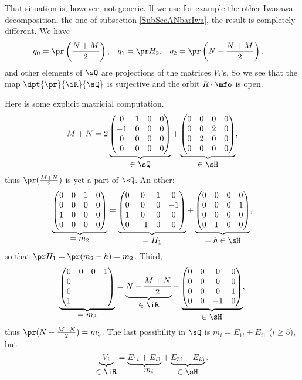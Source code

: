 That situation is, however, not generic. If we use for example the other Iwasawa decomposition, the one of subsection \ref{SubSecANbarIwa}, the result is completely different. We have
\begin{align}
  q_{0}&=\pr\left( \frac{ N+M }{ 2 } \right),
&q_{1}&=\pr H_{2},
&q_{2}&=\pr\left( N-\frac{ N+M }{ 2 } \right),
\end{align}
and other elements of $\sQ$ are projections of the matrices $V_{i}$'s.  So we see that the map $\dpt{\pr}{\iR}{\sQ}$ is surjective and \label{pg:mfo_ouvert} the orbit $R\cdot\mfo$ is open.

Here is some explicit matricial computation.
\[
   M+N=2
 \underbrace{
\begin{pmatrix}
  0 &1&0&0\\
  -1&0&0&0\\
  0 &0&0&0\\
  0 &0&0&0
\end{pmatrix}}_{\displaystyle\in\sQ}
+
\underbrace{
\begin{pmatrix}
  0&0&0&0\\
  0&0&2&0\\
  0&2&0&0\\
  0&0&0&0
\end{pmatrix}}_{\displaystyle\in\sH},
\]
thus $\pr(\frac{M+N}{2})$ is yet a part of $\sQ$. An other:
\[
 \underbrace{
\begin{pmatrix}
  0 &0&1&0\\
  0&0&0&0\\
  1 &0&0&0\\
  0 &0&0&0
\end{pmatrix}}_{\displaystyle =m_2}
= \underbrace{
\begin{pmatrix}
  0 &0  &1 &0\\
  0 &0  &0 &-1\\
  1 & 0 &0 &0\\
  0 &-1 &0 &0
\end{pmatrix}}_{\displaystyle =H_1}
+
\underbrace{
\begin{pmatrix}
  0&0&0&0\\
  0&0&0&1\\
  0&0&0&0\\
  0&1&0&0
\end{pmatrix}}_{\displaystyle =h\in\sH},
\]
so that $\pr H_1=\pr(m_2-h)=m_2$. Third,
\[
\underbrace{
\begin{pmatrix}
 0&0&0&1\\
 0\\
 0\\
 1
\end{pmatrix}}_{\displaystyle=m_3}
=
\underbrace{N-\frac{M+N}{2}}_{\displaystyle\in\iR}
-
\underbrace{%
\begin{pmatrix}
  0&0&0 &0\\
  0&0&0 &0\\
  0&0&0 &1\\
  0&0&-1&0\\
\end{pmatrix}}_{\displaystyle\in\sH},
\]
thus $\pr(N-\frac{M+N}{2})=m_3$. The last possibility in $\sQ$ is $m_i=E_{1i}+E_{i1}$ ($i\geq 5$), but
\[
  \underbrace{V_i}_{\displaystyle\in\iR}
    =\underbrace{E_{1i}+E_{i1}}_{\displaystyle =m_i}+\underbrace{E_{3i}-E_{i3}}_{\displaystyle\in\sH}.
\]

